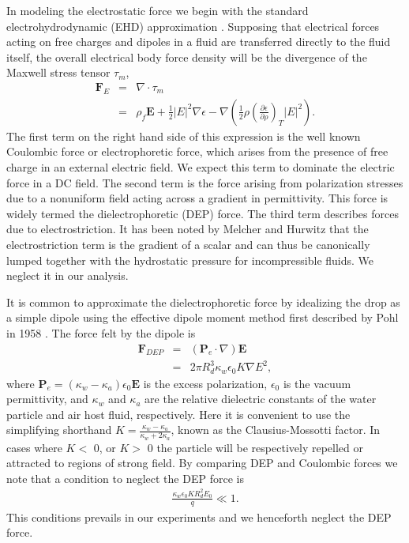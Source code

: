 \documentclass[aip,reprint, floatfix]{revtex4-1}
\begin{document}
In modeling the electrostatic force we begin with the standard electrohydrodynamic (EHD) approximation \cite{saville_electrohydrodynamics:_1997}. Supposing that electrical forces acting on free charges and dipoles in a fluid are transferred directly to the fluid itself, the overall electrical body force density will be the divergence of the Maxwell stress tensor $\tau_m $,
\begin{eqnarray} \label{e_force}
 \mathbf{F}_E &=& \nabla \cdot \tau_m \nonumber \\ 
 &=& \rho_f \mathbf{E} + \frac{1}{2} \left| E \right|^2 \nabla \epsilon - \nabla \left( \frac{1}{2} \rho \left( \frac{\partial \epsilon}{\partial \rho} \right)_T \left| E \right|^2 \right) .
\end{eqnarray}
The first term on the right hand side of this expression is the well known Coulombic force or electrophoretic force, which arises from the presence of free charge in an external electric field. We expect this term to dominate the electric force in a DC field. The second term is the force arising from polarization stresses due to a nonuniform field acting across a gradient in permittivity. This force is widely termed the dielectrophoretic (DEP) force. The third term describes forces due to electrostriction. It has been noted by Melcher and Hurwitz \cite{hurwitz_electrohydrodynamic_1966} that the electrostriction term is the gradient of a scalar and can thus be canonically lumped together with the hydrostatic pressure for incompressible fluids. We neglect it in our analysis. 

It is common to approximate the dielectrophoretic force by idealizing the drop as a simple dipole using the effective dipole moment method first described by Pohl in 1958 \cite{pohl_effects_1958}. The force felt by the dipole is 
\begin{eqnarray}
\mathbf{F}_{DEP} &=& \left( \mathbf{P}_e \cdot \nabla \right) \mathbf{E} \nonumber \\
&=& 2 \pi R_d^3 \kappa_w \epsilon_0 K \nabla E^2, \nonumber
\end{eqnarray}
where $\mathbf{P}_e=(\kappa_w - \kappa_a)\epsilon_0 \mathbf{E}$ is the excess polarization, $\epsilon_0$ is the vacuum permittivity, and $\kappa_w$ and $\kappa_a$ are the relative dielectric constants of the water particle and air host fluid, respectively. Here it is convenient to use the simplifying shorthand $K = \frac{\kappa_w - \kappa_a}{\kappa_w + 2 \kappa_a}$, known as the Clausius-Mossotti factor. In cases where $K <$ 0, or $K>$ 0 the particle will be respectively repelled or attracted to regions of strong field. By comparing DEP and Coulombic forces we note that a condition to neglect the DEP force is
\begin{eqnarray}
\frac{ \kappa_w \epsilon_0 K R_d^2 E_0}{q} \ll 1. \nonumber
\end{eqnarray}
This conditions prevails in our experiments and we henceforth neglect the DEP force. 
\end{document}
